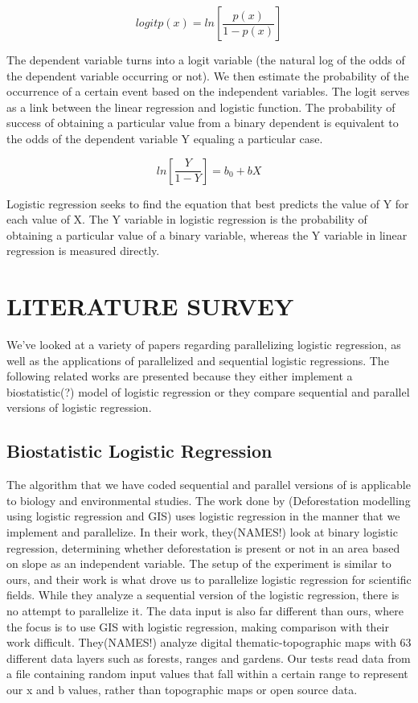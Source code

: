 \documentclass[letterpaper, 10 pt, conference]{ieeeconf}  %
\begin{document}
$$logit p(x) = ln[\frac{p(x)}{1-p(x)}]$$

The dependent variable turns into a logit variable (the natural log of the odds of the dependent variable occurring or not). We then estimate the probability of the occurrence of a certain event based on the independent variables. The logit serves as a link between the linear regression and logistic function. The probability of success of obtaining a particular value from a binary dependent is equivalent to the odds of the dependent variable Y equaling a particular case.

$$ln[\frac{Y}{1-Y}] = b_0 + bX$$

Logistic regression seeks to find the equation that best predicts the value of Y for each value of X. The Y variable in logistic regression is the probability of obtaining a particular value of a binary variable, whereas the Y variable in linear regression is measured directly. %


\section{LITERATURE SURVEY}
We've looked at a variety of papers regarding parallelizing logistic regression, as well as the applications of parallelized and sequential logistic regressions. The following related works are presented because they either implement a biostatistic(?) model of logistic regression or they compare sequential and parallel versions of logistic regression. 

\subsection{Biostatistic Logistic Regression}
The algorithm that we have coded sequential and parallel versions of is applicable to biology and environmental studies. The work done by (Deforestation modelling using logistic regression and GIS) uses logistic regression in the manner that we implement and parallelize. In their work, they(NAMES!) look at binary logistic regression, determining whether deforestation is present or not in an area based on slope as an independent variable. The setup of the experiment is similar to ours, and their work is what drove us to parallelize logistic regression for scientific fields. While they analyze a sequential version of the logistic regression, there is no attempt to parallelize it. The data input is also far different than ours, where the focus is to use GIS with logistic regression, making comparison with their work difficult. They(NAMES!) analyze digital thematic-topographic maps with 63 different data layers such as forests, ranges and gardens. Our tests read data from a file containing random input values that fall within a certain range to represent our x and b values, rather than topographic maps or open source data.
\end{document}
